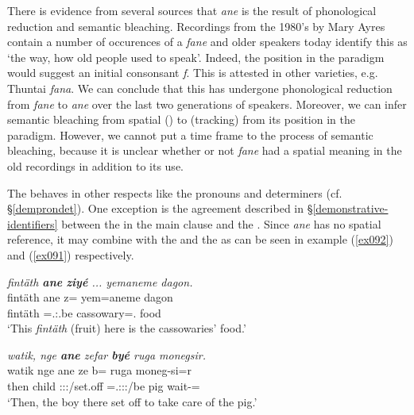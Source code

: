 There is evidence from several sources that \emph{ane} is the result of phonological reduction and semantic bleaching. Recordings from the 1980's by Mary Ayres contain a number of occurences of a  \emph{fane} and older speakers today identify this as `the way, how old people used to speak'. Indeed, the position in the paradigm would suggest an initial consonsant \emph{f}. This is attested in other  varieties, e.g.  Thuntai \emph{fana}. We can conclude that this  has undergone phonological reduction from \emph{fane} to \emph{ane} over the last two generations of speakers. Moreover, we can infer semantic bleaching from spatial () to  (tracking) from its position in the paradigm. However, we cannot put a time frame to the process of semantic bleaching, because it is unclear whether or not \emph{fane} had a spatial meaning in the old recordings in addition to its  use.%

The   behaves in other respects like the  pronouns and determiners (cf. \S{}\ref{demprondet}). One exception is the agreement described in \S{}\ref{demonstrative-identifiers} between the  in the main clause and the  . Since \emph{ane} has no spatial reference, it may combine with the  and the    as can be seen in example (\ref{ex092}) and (\ref{ex091}) respectively.

\begin{exe}
	\ex \emph{fintäth \textbf{ane} \textbf{ziyé} ... yemaneme dagon.}\\
	\gll fintäth ane z= yem=aneme dagon\\
	fintäth \Dem{} \Prox=\Tsg.\Masc:\Nonpast.be cassowary=\Poss{}.\Nsg{} food\\
	\trans `This \emph{fintäth} (fruit) here is the cassowaries' food.'\\
	\label{ex092}
\end{exe}
\begin{exe}
	\ex \emph{watik, nge \textbf{ane} zefar \textbf{byé} ruga monegsir.}\\
	\gll watik nge ane ze b= ruga moneg-si=r\\
	then child \Dem{} \Stsg:\Sbj:\Rpst:\Pfv/set.off \Med{}=\Tsg.\Masc:\Sbj:\Nonpast:\Ipfv/be pig wait-\Nmlz{}=\Purp{}\\
	\trans `Then, the boy there set off to take care of the pig.'
	\label{ex091}
\end{exe}

